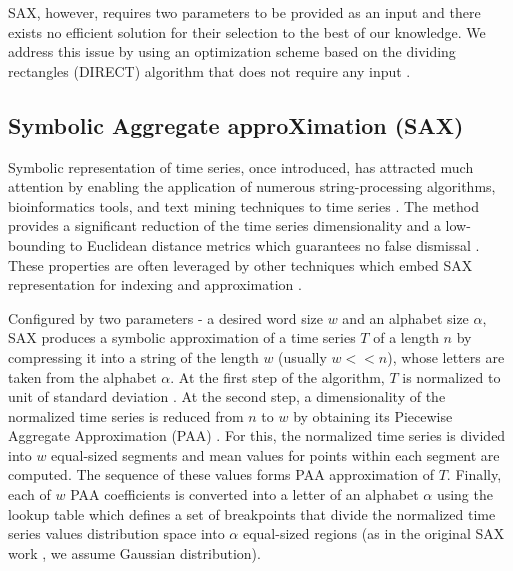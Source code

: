 \documentclass[conference]{IEEEtran}
\begin{document}
SAX, however, requires two parameters to be provided as an input and there exists 
no efficient solution for their selection to the best of our knowledge. 
We address this issue by using an optimization scheme based on the dividing 
rectangles (DIRECT) algorithm that does not require any input \cite{direct}. 

\subsection{Symbolic Aggregate approXimation (SAX)} \label{section-sax}
Symbolic representation of time series, once introduced, has attracted much attention by
enabling the application of numerous string-processing algorithms, bioinformatics tools, 
and text mining techniques to time series \cite{sax}. The method provides a significant 
reduction of the time series dimensionality and a low-bounding to Euclidean distance metrics
which guarantees no false dismissal \cite{hot_sax}.
These properties are often leveraged by other techniques which embed SAX representation 
for indexing and approximation \cite{fast-shapelets}.

Configured by two parameters - a desired word size $w$ and an alphabet size $\alpha$,
SAX produces a symbolic approximation of a time series $T$ of a length $n$ by compressing 
it into a string of the length $w$ (usually $w<<n$), whose letters are taken from 
the alphabet $\alpha$. 
At the first step of the algorithm, $T$ is normalized to unit of standard deviation
\cite{goldin_kanellakis}. 
At the second step, a dimensionality of the normalized time series is reduced from $n$ to $w$ by
obtaining its Piecewise Aggregate Approximation (PAA) \cite{paa}. 
For this, the normalized time series is divided into $w$ equal-sized segments 
and mean values for points within each segment are computed.
The sequence of these values forms PAA approximation of $T$. 
Finally, each of $w$ PAA coefficients is converted into a letter of an alphabet 
$\alpha$ using the lookup table which defines a set of breakpoints that divide 
the normalized time series values distribution space into $\alpha$ equal-sized regions
(as in the original SAX work \cite{sax}, we assume Gaussian distribution).
\end{document}
